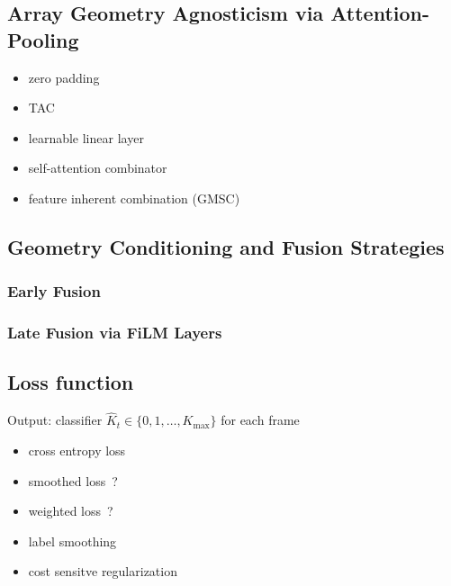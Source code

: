\documentclass[lettersize,journal]{IEEEtran}
\begin{document}
\subsection{Array Geometry Agnosticism via Attention-Pooling}

\begin{itemize}
  \item zero padding
  \item \gls{TAC}
  \item learnable linear layer
  \item self-attention combinator
  \item feature inherent combination (GMSC)
\end{itemize}

\subsubsection{}

\subsection{Geometry Conditioning and Fusion Strategies}

\subsubsection{Early Fusion}
\subsubsection{Late Fusion via FiLM Layers}

\subsection{Loss function}

Output: classifier $\widehat{K}_t \in \{0, 1, \dots, K_{\mathrm{max}}\}$ for each frame

\begin{itemize}
  \item cross entropy loss
  \item smoothed loss~\cite{li2025temporal}?
  \item weighted loss~\cite{li2025temporal}?
  \item label smoothing~\cite{eliav2024concurrent, muller2019when}
  \item cost sensitve regularization~\cite{eliav2024concurrent, galdran2020cost}
\end{itemize}
\end{document}
